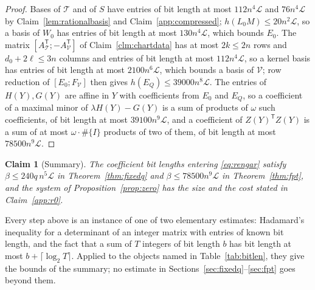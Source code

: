 \documentclass[journal]{IEEEtran}
\theoremstyle{plainn}
\newtheorem{claim}{Claim}
\theoremstyle{remark}
\begin{document}
\begin{proof}
Bases of $\mathcal T$ and of $S$ have entries of bit length at most $112n^4\mathcal L$ and
$76n^4\mathcal L$ by Claim~\ref{lem:rationalbasis} and Claim~\ref{app:compressed};
$h(L_0M)\le20n^2\mathcal L$, so a basis of $W_0$ has entries of bit length at most
$130n^4\mathcal L$, which bounds $E_0$. The matrix $[A_{\mathcal T}^{\mathsf T};-A_{\mathcal V}^{\mathsf T}]$ of
Claim~\ref{clm:chartdata} has at most $2k\le2n$ rows and $d_0+2\ell\le3n$ columns and entries of bit length at most
$112n^4\mathcal L$, so a kernel basis has entries of bit length at most $2100n^6\mathcal L$, which
bounds a basis of $\mathcal V$; row reduction of $[E_0;F_{\mathcal V}]$ then gives
$h(E_Q)\le39000n^8\mathcal L$. The entries of $H(Y),G(Y)$ are affine in $Y$ with coefficients from
$E_0$ and $E_Q$, so a coefficient of a maximal minor of $\lambda H(Y)-G(Y)$ is a sum of products of
$\omega$ such coefficients, of bit length at most $39100n^9\mathcal L$, and a coefficient of
$Z(Y)^{\mathsf T}Z(Y)$ is a sum of at most $\omega\cdot\#\{I\}$ products of two of them, of bit length
at most $78500n^9\mathcal L$.
\end{proof}

\begin{claim}[Summary]\label{app:summary}
The coefficient bit lengths entering \eqref{eq:rengar} satisfy $\beta\le240q\,n^5\mathcal L$ in
Theorem~\ref{thm:fixedq} and $\beta\le78500n^9\mathcal L$ in Theorem~\ref{thm:fpt}, and the system of
Proposition~\ref{prop:zero} has the size and the cost stated in Claim~\ref{app:r0}.
\end{claim}

Every step above is an instance of one of two elementary estimates: Hadamard's inequality for a
determinant of an integer matrix with entries of known bit length, and the fact that a sum of $T$
integers of bit length $b$ has bit length at most $b+\lceil\log_2 T\rceil$. Applied to the objects named
in Table~\ref{tab:bitlen}, they give the bounds of the summary; no estimate in
Sections~\ref{sec:fixedq}--\ref{sec:fpt} goes beyond them.
\end{document}
